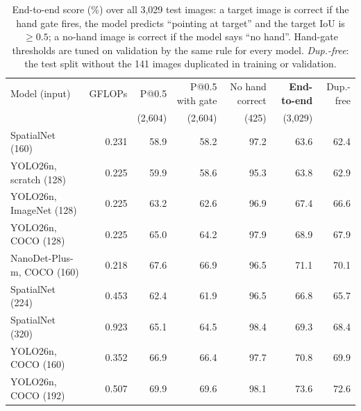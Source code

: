 \begin{table}[t]
  \caption{End-to-end score (\%) over all 3,029 test images: a target image is correct if the hand gate fires, the model predicts ``pointing at target'' and the target IoU is ${\geq}0.5$; a no-hand image is correct if the model says ``no hand''. Hand-gate thresholds are tuned on validation by the same rule for every model. \emph{Dup.-free}: the test split without the 141 images duplicated in training or validation.}
  \label{tab:e2e}
  \footnotesize
  \setlength{\tabcolsep}{4pt}
  \begin{tabular}{lrrrrrr}
    \toprule
    Model (input) & GFLOPs & P@0.5 & P@0.5 with gate & No hand correct & \textbf{End-to-end} & Dup.-free \\
    & & (2,604) & (2,604) & (425) & (3,029) & \\
    \midrule
    SpatialNet (160) & 0.231 & 58.9 & 58.2 & 97.2 & 63.6 & 62.4 \\
    YOLO26n, scratch (128) & 0.225 & 59.9 & 58.6 & 95.3 & 63.8 & 62.9 \\
    YOLO26n, ImageNet (128) & 0.225 & 63.2 & 62.6 & 96.9 & 67.4 & 66.6 \\
    YOLO26n, COCO (128) & 0.225 & 65.0 & 64.2 & 97.9 & 68.9 & 67.9 \\
    NanoDet-Plus-m, COCO (160) & 0.218 & 67.6 & 66.9 & 96.5 & 71.1 & 70.1 \\
    \midrule
    SpatialNet (224) & 0.453 & 62.4 & 61.9 & 96.5 & 66.8 & 65.7 \\
    SpatialNet (320) & 0.923 & 65.1 & 64.5 & 98.4 & 69.3 & 68.4 \\
    YOLO26n, COCO (160) & 0.352 & 66.9 & 66.4 & 97.7 & 70.8 & 69.9 \\
    YOLO26n, COCO (192) & 0.507 & 69.9 & 69.6 & 98.1 & 73.6 & 72.6 \\
    \bottomrule
  \end{tabular}
\end{table}

